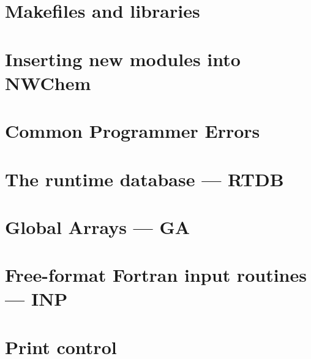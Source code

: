 \chapter{Makefiles and libraries}


\chapter{Inserting new modules into NWChem}


\chapter{Common Programmer Errors}


\chapter{The runtime database --- RTDB}



\chapter{Global Arrays --- GA}


\chapter{Free-format Fortran input routines --- INP}


\chapter{Print control}


